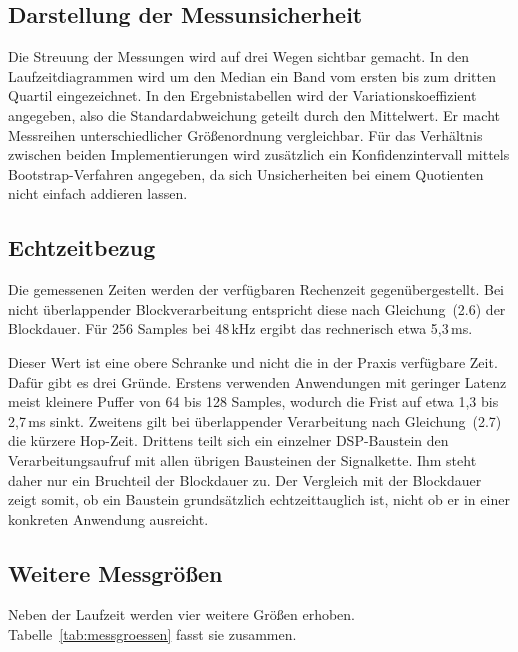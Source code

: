 \subsection{Darstellung der Messunsicherheit}

Die Streuung der Messungen wird auf drei Wegen sichtbar gemacht. In den
Laufzeitdiagrammen wird um den Median ein Band vom ersten bis zum dritten
Quartil eingezeichnet. In den Ergebnistabellen wird der Variationskoeffizient
angegeben, also die Standardabweichung geteilt durch den Mittelwert. Er macht
Messreihen unterschiedlicher Größenordnung vergleichbar. Für das Verhältnis
zwischen beiden Implementierungen wird zusätzlich ein Konfidenzintervall
mittels Bootstrap-Verfahren angegeben, da sich Unsicherheiten bei einem
Quotienten nicht einfach addieren lassen.

\subsection{Echtzeitbezug}

Die gemessenen Zeiten werden der verfügbaren Rechenzeit gegenübergestellt.
Bei nicht überlappender Blockverarbeitung entspricht diese nach
Gleichung~(2.6) der Blockdauer. Für 256 Samples bei 48\,kHz ergibt das
rechnerisch etwa 5{,}3\,ms.

Dieser Wert ist eine obere Schranke und nicht die in der Praxis verfügbare
Zeit. Dafür gibt es drei Gründe. Erstens verwenden Anwendungen mit geringer
Latenz meist kleinere Puffer von 64 bis 128 Samples, wodurch die Frist auf
etwa 1{,}3 bis 2{,}7\,ms sinkt. Zweitens gilt bei überlappender Verarbeitung
nach Gleichung~(2.7) die kürzere Hop-Zeit. Drittens teilt sich ein einzelner
DSP-Baustein den Verarbeitungsaufruf mit allen übrigen Bausteinen der
Signalkette. Ihm steht daher nur ein Bruchteil der Blockdauer zu. Der
Vergleich mit der Blockdauer zeigt somit, ob ein Baustein grundsätzlich
echtzeittauglich ist, nicht ob er in einer konkreten Anwendung ausreicht.

\subsection{Weitere Messgrößen}

Neben der Laufzeit werden vier weitere Größen erhoben.
Tabelle~\ref{tab:messgroessen} fasst sie zusammen.

